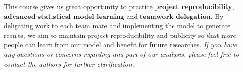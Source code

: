 \documentclass[a4paper]{article}
\begin{document}
\begin{flushleft}
This course gives us great opportunity to practice \textbf{project reproducibility}, \textbf{advanced statistical model learning} and \textbf{teamwork delegation}. By deligating work to each team mate and implementing the model to generate results, we aim to maintain project reproducibility and publicity so that more people can learn from our model and benefit for future researches. \textit{If you have any questions or concerns regarding any part of our analysis, please feel free to contact the authors for further clarification.} \newline

\end{flushleft}
\end{document}
